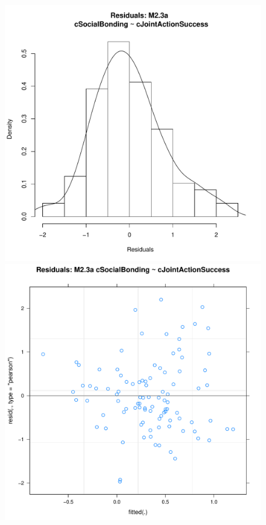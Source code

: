 {\begin{figure}[htbp]
  \includegraphics[scale =.4]{images/MLM23aHist.pdf}
  \includegraphics[scale =.4]{images/MLM23aScatter.pdf}

\end{figure}}
